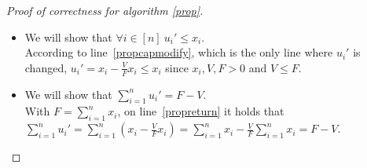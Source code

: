 \begin{proof}[Proof of correctness for algorithm \ref{prop}]
   \begin{itemize}
      \item We will show that $\forall i \in [n] \: u_i' \leq x_i$. \\
      According to line~\ref{propcapmodify}, which is the only line where $u_i'$ is changed,
      $u_i' = x_i - \frac{V}{F}x_i \leq x_i$ since $x_i, V, F > 0$ and $V \leq F$.
      \item We will show that $\sum\limits_{i=1}^{n}u_i' = F - V$. \\
      With $F = \sum\limits_{i=1}^{n}x_i$, on line~\ref{propreturn} it holds that $\sum\limits_{i=1}^{n}u_i' =
      \sum\limits_{i=1}^{n}(x_i - \frac{V}{F}x_i) = \sum\limits_{i=1}^{n}x_i - \frac{V}{F}\sum\limits_{i=1}^{n}x_i =
      F - V$.
   \end{itemize}
\end{proof}
